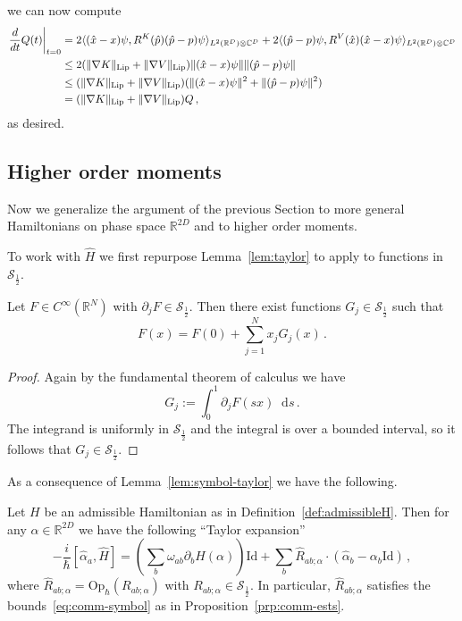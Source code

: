 \documentclass[11pt]{amsart}
\def\bbC{{\mathbb{C}}}
\def\Op{\mathrm{Op}}
\def\Id{\mathrm{Id}}
\def\Real{{\mathbb R}}
\newcommand{\diff}{\mathop{}\!\mathrm{d}}
\newcommand{\mcal}[1]{{\mathcal{#1}}}
\numberwithin{equation}{section}
\begin{document}
we can now compute
\begin{align*}
\left.\frac{d}{dt} Q(t) \right|_{t=0}
&= 2 \langle (\hat{x}-x)\psi, R^K(\hat{p}) (\hat{p}-p) \psi\rangle_{L^2(\Real^D)\otimes \bbC^D}
+ 2 \langle (\hat{p}-p)\psi, R^V(\hat{x}) (\hat{x}-x) \psi\rangle_{L^2(\Real^D)\otimes \bbC^D} \\
&\leq 2 (\|\nabla K\|_{\rm Lip} + \|\nabla V\|_{\rm Lip}) \|(\hat{x}-x)\psi\| \|(\hat{p}-p)\psi\| \\
&\leq (\|\nabla K\|_{\rm Lip} + \|\nabla V\|_{\rm Lip}) (\|(\hat{x}-x)\psi\|^2 + \|(\hat{p}-p)\psi\|^2) \\
&= (\|\nabla K\|_{\rm Lip} + \|\nabla V\|_{\rm Lip}) Q\,,
\end{align*}
as desired.



\subsection{Higher order moments}
\label{sec:Hgenloc}
Now we generalize the argument of the previous Section to more general Hamiltonians on phase space $\Real^{2D}$ and to higher order moments.

To work with $\hat{H}$ we first repurpose Lemma~\ref{lem:taylor} to apply to functions in $\mcal{S}_{\frac12}$.
\begin{lemma}
\label{lem:symbol-taylor}
Let $F\in C^\infty(\Real^N)$ with $\partial_j F\in\mcal{S}_{\frac12}$.
Then there exist functions $G_j\in \mcal{S}_{\frac12}$
such that
\[
F(x) = F(0) + \sum_{j=1}^N x_j G_j(x)\,.
\]
\end{lemma}
\begin{proof}
Again by the fundamental theorem of calculus we have
\[
G_j := \int_0^1 \partial_j F(sx)\diff s\,.
\]
The integrand is uniformly in $\mcal{S}_\frac12$ and the integral is over a bounded interval, so it follows that $G_j\in\mcal{S}_\frac12$.
\end{proof}

As a consequence of Lemma~\ref{lem:symbol-taylor} we have the following.
\begin{lemma}
Let $H$ be an admissible Hamiltonian as in Definition~\ref{def:admissibleH}.  Then
for any $\alpha\in\Real^{2D}$ we have the following ``Taylor expansion''
\begin{equation}
\label{eq:op-taylor}
-\frac{i}{\hbar}[\hat{\alpha}_a, \hat{H}] =
\left(\sum_b \omega_{ab} \partial_b H(\alpha) \right)\Id
+ \sum_b \hat{R}_{ab;\alpha} \cdot (\hat{\alpha}_b - \alpha_b\Id)\,,
\end{equation}
where $\hat{R}_{ab;\alpha} = \Op_\hbar(R_{ab;\alpha})$ with $R_{ab;\alpha}\in\mcal{S}_{\frac12}$.  In particular,
$\hat{R}_{ab;\alpha}$ satisfies the bounds~\eqref{eq:comm-symbol} as in Proposition~\ref{prp:comm-ests}.
\end{lemma}
\end{document}
